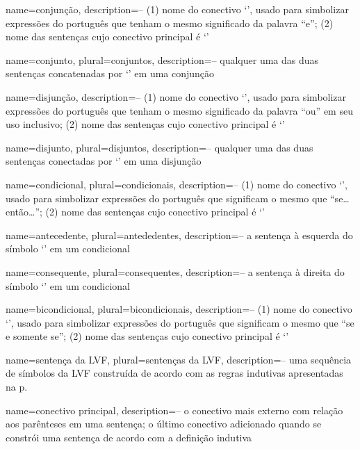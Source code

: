 {
 name=conjunção,
 description={-- (1) nome do conectivo `\eand', usado para simbolizar expressões do português que tenham o mesmo significado da palavra ``e''; (2) nome das sentenças cujo conectivo principal é `\eand'}
}

{
 name=conjunto,
 plural=conjuntos,
 description={-- qualquer uma das duas sentenças concatenadas por `\eand' em uma conjunção}
}

{
 name=disjunção,
 description={-- (1) nome do conectivo `\eor', usado para simbolizar expressões do português que tenham o mesmo significado da palavra ``ou'' em seu uso inclusivo; (2) nome das sentenças cujo conectivo principal é `\eor'}
}

{
 name=disjunto,
 plural=disjuntos,
 description={-- qualquer uma das duas sentenças conectadas por `\eor' em uma disjunção}
}

{
 name=condicional,
 plural=condicionais,
 description={-- (1) nome do conectivo `\eif', usado para simbolizar expressões do português que significam o mesmo que ``se\ldots{}então\ldots''; (2) nome das sentenças cujo conectivo principal é `\eif'}
}

{
 name=antecedente,
 plural=antededentes,
 description={-- a sentença à esquerda do símbolo `\eif' em um condicional}
}

{
 name=consequente,
 plural=consequentes,
 description={-- a sentença à direita do símbolo `\eif' em um condicional}
}

{
 name=bicondicional,
 plural=bicondicionais,
 description={-- (1) nome do conectivo `\eiff', usado para simbolizar expressões do português que significam o mesmo que ``se e somente se''; (2) nome das sentenças cujo conectivo principal é `\eiff'}
}

{
 name=sentença da LVF,
 plural=sentenças da LVF,
 description={-- uma sequência de símbolos da LVF construída de acordo com as regras indutivas apresentadas na p.~\pageref{TFLsentences}}
}

{
 name=conectivo principal,
 description={-- o conectivo mais externo com relação aos parênteses em uma sentença; o último conectivo adicionado quando se constrói uma sentença de acordo com a definição indutiva}
}

